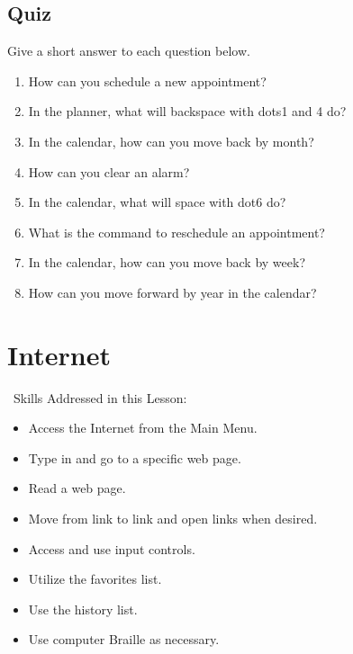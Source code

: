 \documentclass[10pt,letterpaper,twoside]{report}
\begin{document}
{{{\subsection{Quiz}
Give a short answer to each question below.
\begin{enumerate}
	\item How can you schedule a new appointment?
	\item In the planner, what will backspace with dots1 and 4 do?
	\item In the calendar, how can you move back by month?
	\item How can you clear an alarm?
	\item In the calendar, what will space with dot6 do?
	\item What is the command to reschedule an appointment?
	\item In the calendar, how can you move back by week?
	\item How can you move forward by year in the calendar?
\end{enumerate}
\clearpage
\section{ Internet}
\
Skills Addressed in this Lesson:
\begin{itemize}
	\item Access the Internet from the Main Menu.
	\item Type in and go to a specific web page.
	\item Read a web page.
	\item Move from link to link and open links when desired.
	\item Access and use input controls.
	\item Utilize the favorites list.
	\item Use the history list.
	\item Use computer Braille as necessary.
\end{itemize}

}}}
\end{document}
